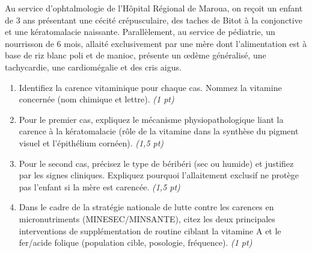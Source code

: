 \documentclass[11pt]{article}
\begin{document}
\begin{exercice}
Au service d'ophtalmologie de l'Hôpital Régional de Maroua, on reçoit un enfant de 3 ans présentant une cécité crépusculaire, des taches de Bitot à la conjonctive et une kératomalacie naissante. Parallèlement, au service de pédiatrie, un nourrisson de 6 mois, allaité exclusivement par une mère dont l'alimentation est à base de riz blanc poli et de manioc, présente un œdème généralisé, une tachycardie, une cardiomégalie et des cris aigus.

\begin{enumerate}
    \item Identifiez la carence vitaminique pour chaque cas. Nommez la vitamine concernée (nom chimique et lettre). \textit{(1 pt)}
    \item Pour le premier cas, expliquez le mécanisme physiopathologique liant la carence à la kératomalacie (rôle de la vitamine dans la synthèse du pigment visuel et l'épithélium cornéen). \textit{(1,5 pt)}
    \item Pour le second cas, précisez le type de béribéri (sec ou humide) et justifiez par les signes cliniques. Expliquez pourquoi l'allaitement exclusif ne protège pas l'enfant si la mère est carencée. \textit{(1,5 pt)}
    \item Dans le cadre de la stratégie nationale de lutte contre les carences en micronutriments (MINESEC/MINSANTE), citez les deux principales interventions de supplémentation de routine ciblant la vitamine A et le fer/acide folique (population cible, posologie, fréquence). \textit{(1 pt)}
\end{enumerate}
\end{exercice}
\end{document}
